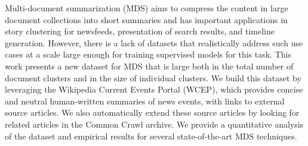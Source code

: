 Multi-document summarization (MDS) aims to compress the content in large document collections into short summaries and has important applications in story clustering for newsfeeds, presentation of search results, and timeline generation. However, there is a lack of datasets that realistically address such use cases at a scale large enough for training supervised models for this task. This work presents a new dataset for MDS that is large both in the total number of document clusters and in the size of individual clusters. We build this dataset by leveraging the Wikipedia Current Events Portal (WCEP), which provides concise and neutral human-written summaries of news events, with links to external source articles. We also automatically extend these source articles by looking for related articles in the Common Crawl archive. We provide a quantitative analysis of the dataset and empirical results for several state-of-the-art MDS techniques.
